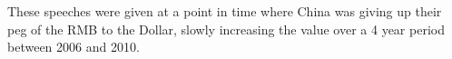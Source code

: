 These speeches were given at a point in time where China was giving up 
their peg of the RMB to the Dollar, slowly increasing the value over a 4 
year period between 2006 and 2010.




